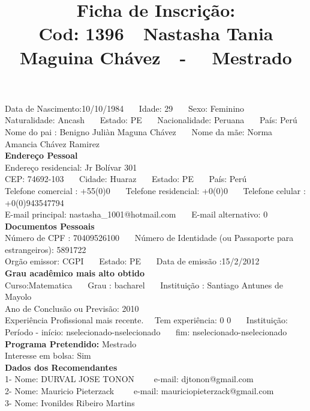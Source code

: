 \documentclass[11pt]{article}
\title{\vspace*{-4cm} Ficha de Inscrição: \\Cod: 1396\ \ Nastasha Tania Maguina Chávez\ \ - \ \ Mestrado 
 }
\date{}
\begin{document}
\maketitle
\vspace*{-1.5cm}
\noindent Data de Nascimento:10/10/1984
\ \ \ Idade: 29   \ \ \ Sexo: Feminino
\\
Naturalidade: Ancash  
\ \ \  Estado: PE
\ \ \  Nacionalidade: Peruana
\ \ \ País: Perú
\\        
Nome do pai : Benigno Juliàn Maguna Chávez
\ \ \ Nome da mãe: Norma Amancia Chávez Ramirez          
\\[0.2cm]                     
\textbf{Endereço Pessoal} 
\\ 
\noindent Endereço residencial: Jr Bolívar 301
\\
        CEP: 74692-103 
\ \ \ Cidade: Huaraz 
\ \ \ Estado: PE 
\ \ \ País: Perú
\\		
		Telefone comercial : +55(0)0
\ \ \ Telefone residencial: +0(0)0
\ \ \ Telefone celular : +0(0)943547794
\\
E-mail principal: nastasha\_1001@hotmail.com
\ \ \ E-mail alternativo: 0 
\\[0.2cm] 
\textbf{Documentos Pessoais}
\\
\noindent Número de CPF : 70409526100
\ \ \ Número de Identidade (ou Passaporte para estrangeiros): 5891722
\\
Orgão emissor: CGPI
\ \ \ Estado: PE
\ \ \ Data de emissão :15/2/2012
\\[0.3cm]
\textbf{Grau acadêmico mais alto obtido}
\\	
Curso:Matematica
\ \ \ Grau : bacharel
\ \ \ Instituição : Santiago Antunes de Mayolo
\\			
Ano de Conclusão ou Previsão: 2010
\\ 
Experiência Profissional mais recente. \ \  
Tem experiência: 0 0  
\ \ \ Instituição: 
\\  
Período - início: nselecionado-nselecionado
\ \ \ fim: nselecionado-nselecionado
\\[0.2cm] 
\textbf{Programa Pretendido:} Mestrado\\
Interesse em bolsa: Sim
\\[0.3cm]		
\textbf{Dados dos Recomendantes} 
\\
1- Nome: DURVAL JOSE TONON
\ \ \ \  e-mail: djtonon@gmail.com 
\\
2- Nome: Mauricio Pieterzack
\ \ \ \ e-mail: mauriciopieterzack@gmail.com
\\
3- Nome: Ivonildes Ribeiro Martins
\end{document}
